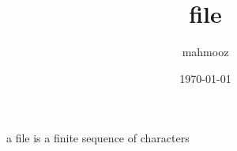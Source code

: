 \documentclass[11pt]{article}
\author{mahmooz}
\date{\today}
\title{file}
\begin{document}
\maketitle
\tableofcontents

a file is a finite sequence of characters\\[0pt]
\end{document}
